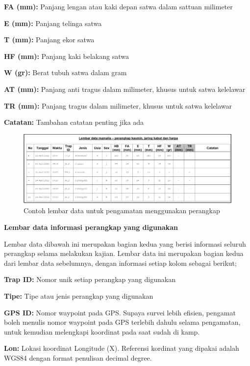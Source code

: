 \documentclass[
]{book}
\begin{document}
\textbf{FA (mm):} Panjang lengan atau kaki depan satwa dalam sattuan milimeter

\textbf{E (mm):} Panjang telinga satwa

\textbf{T (mm):} Panjang ekor satwa

\textbf{HF (mm): }Panjang kaki belakang satwa

\textbf{W (gr):} Berat tubuh satwa dalam gram

\textbf{AT (mm): }Panjang anti tragus dalam milimeter, khusus untuk satwa kelelawar

\textbf{TR (mm):} Panjang tragus dalam milimeter, khusus untuk satwa kelelawar

\textbf{Catatan: }Tambahan catatan penting jika ada

\begin{figure}

{\centering \includegraphics[width=1\linewidth]{images/ldm_pk} 

}

\caption{Contoh lembar data untuk pengamatan menggunakan perangkap}\label{fig:ldmpk}
\end{figure}

\textbf{Lembar data informasi perangkap yang digunakan}

Lembar data dibawah ini merupakan bagian kedua yang berisi informasi seluruh perangkap selama melakukan kajian. Lembar data ini merupakan bagian kedua dari lembar data sebelumnya, dengan informasi setiap kolom sebagai berikut;

\textbf{Trap ID:} Nomor unik setiap perangkap yang digunakan

\textbf{Tipe:} Tipe atau jenis perangkap yang digunakan

\textbf{GPS ID:} Nomor waypoint pada GPS. Supaya survei lebih efisien, pengamat boleh menulis nomor waypoint pada GPS terlebih dahulu selama pengamatan, untuk kemudian melengkapi koordinat pada saat sudah di kamp.

\textbf{Lon:} Lokasi koordinat Longitude (X). Referensi kordinat yang dipakai adalah WGS84 dengan format penulisan decimal degree.
\end{document}
